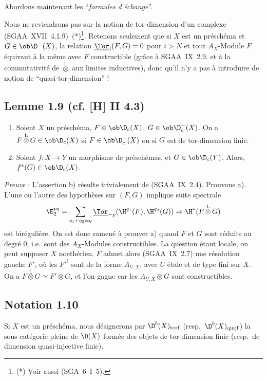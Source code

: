 Abordons maintenant les ``\emph{formules d'échange}''.

Nous ne reviendrons pas sur la notion de tor-dimension d'un complexe (SGAA~XVII~4.1.9)~(*)\footnote{(*) Voir aussi (SGA~6~I~5).}. Retenons seulement que si $X$ est un préschéma et $G \in \ob \D^{-}(X)$, la relation $\underline{\Tor}_i(F,G) = 0$ pour $i > N$ et tout $A_X$-Module $F$ équivaut à la même avec $F$ constructible (grâce à SGAA~IX~2.9. et à la commutativité de $\mathop{\otimes}\limits^{\mathrm{L}}$ aux limites inductives), donc qu'il n'y a pas à introduire de notion de ``quasi-tor-dimension'' !

\subsection*{Lemme 1.9 (cf. [H] II 4.3)}
\begin{enumerate}
\item[a)] Soient $X$ un préschéma, $F \in \ob \D_c(X)$, $G \in \ob \D_c^{-}(X)$. On a $F \mathop{\otimes}\limits^{\mathrm{L}} G \in \ob \D_c(X)$ si $F \in \ob \D_c^{-}(X)$ ou si $G$ est de tor-dimension finie.
\item[b)] Soient $f : X \to Y$ un morphisme de préschémas, et $G \in \ob \D_c(Y)$. Alors, $f^{*}(G) \in \ob \D_c(X)$.
\end{enumerate}

\emph{Preuve} : L'assertion b) résulte trivialement de (SGAA~IX~2.4). Prouvons a). L'une ou l'autre des hypothèses sur $(F,G)$ implique  suite spectrale
\[
\E_2^{pq} = \sum_{q_1+q_2=q} \underline{\Tor}_{-p}(\H^{q_1}(F), \H^{q_2}(G)) \Rightarrow \H^{*}(F \mathop{\otimes}\limits^{\mathrm{L}} G)
\]
est birégulière. On est donc ramené à prouver a) quand $F$ et $G$ sont réduits au degré $0$, i.e.~sont des $A_X$-Modules constructibles. La question étant locale, on peut supposer $X$ noethérien. $F$ admet alors (SGAA~IX~2.7) une résolution gauche $F'$, où les $F'^i$ sont de la forme $A_{U,X}$, avec $U$ étale et de type fini sur $X$. On a $F \mathop{\otimes}\limits^{\mathrm{L}} G \simeq F' \otimes G$, et l'on gagne car les $A_{U,X} \otimes G$ sont constructibles.

\subsection*{Notation 1.10}
Si $X$ est un préschéma, nous désignerons par $\D^{b}(X)_{\mathrm{torf}}$ (resp.~$\D^{b}(X)_{\mathrm{qinjf}}$) la sous-catégorie pleine de $\D(X)$ formée des objets de tor-dimension finie (resp.~de dimension quasi-injective finie).


